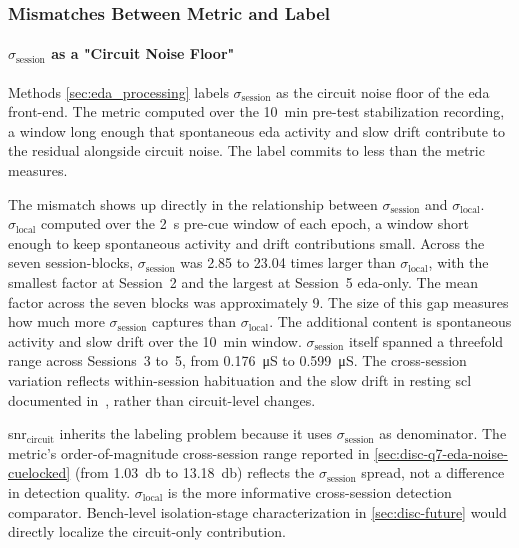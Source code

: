 \subsubsection{Mismatches Between Metric and Label}      
\label{sec:disc-lim-mismatch}

\paragraph{$\sigma_\text{session}$ as a "Circuit Noise Floor"}  
\label{sec:disc-lim-sigma-session}

Methods \autoref{sec:eda_processing} labels $\sigma_\text{session}$ as the circuit noise floor of the \gls{eda} front-end. The metric computed over the \SI{10}{\minute} pre-test stabilization recording, a window long enough that spontaneous \gls{eda} activity and slow drift contribute to the residual alongside circuit noise. The label commits to less than the metric measures.

The mismatch shows up directly in the relationship between $\sigma_\text{session}$ and $\sigma_\text{local}$. $\sigma_\text{local}$ computed over the \SI{2}{\second} pre-cue window of each epoch, a window short enough to keep spontaneous activity and drift contributions small. Across the seven session-blocks, $\sigma_\text{session}$ was \num{2.85} to \num{23.04} times larger than $\sigma_\text{local}$, with the smallest factor at Session~2 and the largest at Session~5 \gls{eda}-only. The mean factor across the seven blocks was approximately \num{9}. The size of this gap measures how much more $\sigma_\text{session}$ captures than $\sigma_\text{local}$. The additional content is spontaneous activity and slow drift over the \SI{10}{\minute} window. $\sigma_\text{session}$ itself spanned a threefold range across Sessions~3 to~5, from \SI{0.176}{\micro\siemens} to \SI{0.599}{\micro\siemens}. The cross-session variation reflects within-session habituation and the slow drift in resting \gls{scl} documented in~\cite{boucsein_electrodermal_2012}, rather than circuit-level changes.

\gls{snr}$_{\text{circuit}}$ inherits the labeling problem because it uses $\sigma_\text{session}$ as denominator. The metric's order-of-magnitude cross-session range reported in \autoref{sec:disc-q7-eda-noise-cuelocked} (from \SI{1.03}{\decibel} to \SI{13.18}{\decibel}) reflects the $\sigma_\text{session}$ spread, not a difference in detection quality. $\sigma_\text{local}$ is the more informative cross-session detection comparator. Bench-level isolation-stage characterization in \autoref{sec:disc-future} would directly localize the circuit-only contribution.

